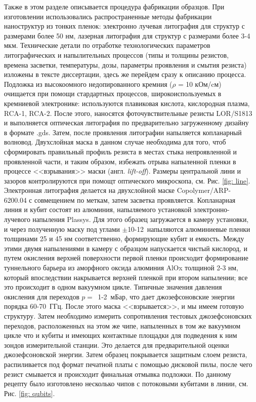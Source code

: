 Также в этом разделе описывается процедура фабрикации образцов. При изготовлении использовались распространенные методы фабрикации наноструктур из тонких пленок: электронно лучевая литография для структур с размерами более 50 нм, лазерная литография для структур с размерами более 3-4 мкм. Технические детали по отработке технологических параметров литографических и напылительных процессов (типы и толщины резистов, времена засветки, температуры, дозы, параметры проявления и смытия резиста) изложены в тексте диссертации, здесь же перейдем сразу к описанию процесса. Подложка из высокоомного недопированного кремния ($\rho$ = 10 кОм/cм) очищается при помощи стардартных процессов, широкоиспользуемых в кремниевой электронике: используются плавиковая кислота, кислородная плазма, RCA-1, RCA-2. После этого, наносятся фоточувствительные резисты LOR/S1813 и выполняется оптическая литография по предварительно загруженному дизайну в формате .gds. Затем, после проявления литографии напыляется копланарный волновод. Двухслойная маска в данном случае необходима для того, чтоб сформировать правильный профиль резиста в местах стыка непроявленной и проявленной части, и таким образом, избежать отрыва напыленной пленки в процессе <<взрывания>> маски (англ. \textit{lift-off}). Размеры центральной лини и зазоров контролируются при помощт оптического микроскопа, см. Рис. \ref{fig: line}. Электронная литография делается на двухслойной маске Copolymer/ARP-6200.04 с совмещением по меткам, затем засветка проявляется. Копланарная линия и кубит состоят из алюминия, напыляемого установкой электронно-лучевого напыления Plassys. Для этого образец загружается в камеру установки, и через полученную маску под углами $\pm$10-12\textdegree~напыляются алюминиевые пленки толщинами 25 и 45 нм соответственно, формирующие кубит и емкость. Между этими двумя напылениями в камеру с образцом напускается чистый кислород, и путем окисления верхней поверхности первой пленки происходит формирование туннельного барьера из аморфного оксида алюминия AlOx толщиной 2-3 нм, который впоследствии накрывается верхней пленкой при втором напылении; все это происходит в одном вакуумном цикле.  Типичные значения давления окисления для переходов  $p=$~1-2~мБар, что дает джозефсоновские энергии порядка 60-70~ГГц. После этого маска <<взрывается>>, и мы имеем готовую структуру. Затем необходимо измерить сопротивления тестовых джозефсоновских переходов, расположенных на этом же чипе, напыленных в том же вакуумном цикле что и кубиты и имеющих контактные площадки для подведения к ним зондов измерительной станции. Это делается для предварительной оценки джозефсоновской энергии. Затем образец покрывается защитным слоем резиста, распиливается под формат печатной платы с помощью дисковой пилы, после чего резист смывается и происходит финальная отмывка подложки. По данному рецепту было изготовлено несколько чипов с потоковыми кубитами в линии, см. Рис. \ref{fig: qubits}. 

